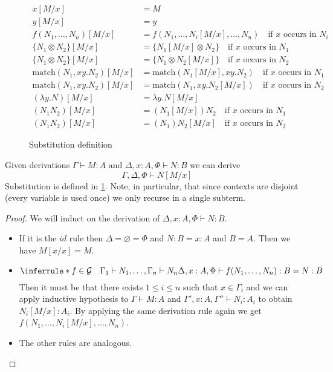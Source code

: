 \documentclass[acmsmall,screen, nonacm, anonymous]{acmart}
\begin{document}
\begin{figure}
\begin{align*}
x[M/x] &= M\\
y[M/x] &= y\\
f(N_1, \ldots, N_n)[M/x] &= f(N_1, \ldots, N_i[M/x], \ldots, N_n) \quad \text{if $x$ occurs in $N_i$}\\
\{N_1 \otimes N_2\}[M/x] &= \{N_1[M/x] \otimes N_2\} \quad \text{if $x$ occurs in $N_1$}\\
\{N_1 \otimes N_2\}[M/x] &= \{N_1 \otimes N_2[M/x]\} \quad \text{if $x$ occurs in $N_2$}\\
\text{match}(N_1,xy.N_2)[M/x] &= \text{match}(N_1[M/x], xy.N_2) \quad \text{if $x$ occurs in $N_1$}\\
\text{match}(N_1,xy.N_2)[M/x] &= \text{match}(N_1, xy.N_2[M/x]) \quad \text{if $x$ occurs in $N_2$}\\
(\lambda y . N)[M / x] &= \lambda y . N[M/x]\\
(N_1 N_2)[M / x] &= (N_1[M/x])N_2 \quad \text{if $x$ occurs in $N_1$}\\
(N_1 N_2)[M / x] &= (N_1)N_2[M/x] \quad \text{if $x$ occurs in $N_2$}
\end{align*}
\caption{Substitution definition}
\label{fig:sub-def}
\end{figure}

\begin{lemma}
  Given derivations $\Gamma \vdash M : A$ and $\Delta, x : A, \Phi \vdash N : B$ we can derive
  \[
  \Gamma, \Delta, \Phi \vdash N[M / x]
  \]
  Substitution is defined in \cref{fig:sub-def}.
  Note, in particular, that since contexts are disjoint (every variable is used once) we only recurse in a single subterm.
\end{lemma}
\begin{proof}
  We will induct on the derivation of $\Delta, x : A, \Phi \vdash N : B$.
  \begin{itemize}
    \item If it is the $id$ rule then $\Delta = \varnothing = \Phi$ and $N : B = x : A$ and $B = A$. Then we have $M[x/x] = M$.
    \item  
    \[
    \inferrule*{f \in \mathcal{G} \quad \Gamma_1 \vdash N_1, \ldots, \Gamma_n \vdash N_n}{\Delta , x : A, \Phi \vdash f(N_1, \ldots, N_n) : B = N : B}
    \]
    Then it must be that there exists $1 \leq i \leq n$ such that $x \in \Gamma_i$ and we can apply inductive hypothesis to $\Gamma \vdash M : A$ and $\Gamma', x : A, \Gamma'' \vdash N_i : A_i$ to obtain $N_i[M/x] : A_i$.
    By applying the same derivation rule again we get $f(N_1, \ldots, N_i[M/x], \ldots, N_n)$.
    \item The other rules are analogous.
  \end{itemize}
\end{proof}
\end{document}
